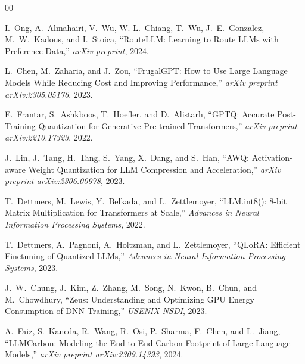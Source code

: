\documentclass[conference]{IEEEtran}
\begin{document}
\begin{thebibliography}{00}

 I.~Ong, A.~Almahairi, V.~Wu, W.-L.~Chiang, T.~Wu,
J.~E.~Gonzalez, M.~W.~Kadous, and I.~Stoica, ``RouteLLM: Learning to
Route LLMs with Preference Data,'' \emph{arXiv preprint}, 2024.

 L.~Chen, M.~Zaharia, and J.~Zou, ``FrugalGPT: How to
Use Large Language Models While Reducing Cost and Improving
Performance,'' \emph{arXiv preprint arXiv:2305.05176}, 2023.

 E.~Frantar, S.~Ashkboos, T.~Hoefler, and D.~Alistarh,
``GPTQ: Accurate Post-Training Quantization for Generative
Pre-trained Transformers,'' \emph{arXiv preprint arXiv:2210.17323},
2022.

 J.~Lin, J.~Tang, H.~Tang, S.~Yang, X.~Dang, and S.~Han,
``AWQ: Activation-aware Weight Quantization for LLM Compression and
Acceleration,'' \emph{arXiv preprint arXiv:2306.00978}, 2023.

 T.~Dettmers, M.~Lewis, Y.~Belkada, and L.~Zettlemoyer,
``LLM.int8(): 8-bit Matrix Multiplication for Transformers at Scale,''
\emph{Advances in Neural Information Processing Systems}, 2022.

 T.~Dettmers, A.~Pagnoni, A.~Holtzman, and L.~Zettlemoyer,
``QLoRA: Efficient Finetuning of Quantized LLMs,'' \emph{Advances in
Neural Information Processing Systems}, 2023.

 J.~W.~Chung, J.~Kim, Z.~Zhang, M.~Song, N.~Kwon, B.~Chun,
and M.~Chowdhury, ``Zeus: Understanding and Optimizing GPU Energy
Consumption of DNN Training,'' \emph{USENIX NSDI}, 2023.

 A.~Faiz, S.~Kaneda, R.~Wang, R.~Osi, P.~Sharma,
F.~Chen, and L.~Jiang, ``LLMCarbon: Modeling the End-to-End Carbon
Footprint of Large Language Models,'' \emph{arXiv preprint
arXiv:2309.14393}, 2024.

\end{thebibliography}
\end{document}
